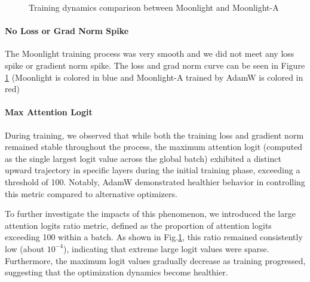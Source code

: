 \begin{figure}[htbp]
    \centering
    
    \vspace{0.5em}
    
    
    \caption{Training dynamics comparison between Moonlight and Moonlight-A}
    \label{fig:training_dynamics}
\end{figure}

\paragraph{No Loss or Grad Norm Spike} The Moonlight training process was very smooth and we did not meet any loss spike or gradient norm spike. The loss and grad norm curve can be seen in Figure \ref{fig:training_dynamics} (Moonlight is colored in blue and Moonlight-A trained by AdamW is colored in red)


\paragraph{Max Attention Logit} During training, we observed that while both the training loss and gradient norm remained stable throughout the process, the maximum attention logit (computed as the single largest logit value across the global batch) exhibited a distinct upward trajectory in specific layers during the initial training phase, exceeding a threshold of 100. Notably, AdamW demonstrated healthier behavior in controlling this metric compared to alternative optimizers.

To further investigate the impacts of this phenomenon, we introduced the large attention logits ratio metric, defined as the proportion of attention logits exceeding 100 within a batch. As shown in Fig.\ref{fig:training_dynamics}, this ratio remained consistently low (about $10^{-4}$), indicating that extreme large logit values were sparse. Furthermore, the maximum logit values gradually decrease as training progressed, suggesting that the optimization dynamics become healthier.

